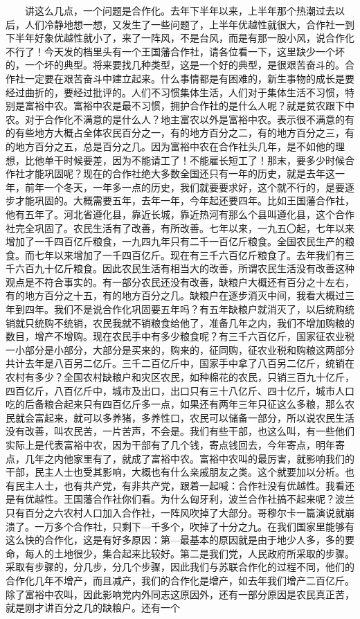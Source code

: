 \documentclass[cn,11pt,chinese]{elegantbook}
\begin{document}
　　讲这么几点，一个问题是合作化。去年下半年以来，上半年那个热潮过去以后，人们冷静地想一想，又发生了一些问题了，上半年优越性就很大，合作社一到下半年好象优越性就小了，来了一阵风，不是台风，而是有那一股小风，说合作化不行了！今天发的档里头有一个王国藩合作社，请各位看一下，这里缺少一个坏的，一个坏的典型。将来要找几种类型，这是一个好的典型，是很艰苦奋斗的。合作社一定要在艰苦奋斗中建立起来。什么事情都是有困难的，新生事物的成长是要经过曲折的，要经过批评的。人们不习惯集体生活，人们对于集体生活不习惯，特别是富裕中农。富裕中农是最不习惯，拥护合作社的是什么人呢？就是贫农跟下中农。对于合作化不满意的是什么人？地主富农以外是富裕中农。表示很不满意的有的有些地方大概占全体农民百分之一，有的地方百分之二，有的地方百分之三，有的地方百分之五，总是百分之几。因为富裕中农在合作社头几年，是不如他的理想，比他单干时候要差，因为不能请工了！不能雇长短工了！那末，要多少时候合作社才能巩固呢？现在的合作社绝大多数全国还只有一年的历史，就是去年这一年，前年一个冬天，一年多一点的历史，我们就要要求好，这个就不行的，是要逐步才能巩固的。大概需要五年，去年一年，今年起还要四年。比如王国藩合作社，他有五年了。河北省遵化县，靠近长城，靠近热河有那么个县叫遵化县，这个合作社完全巩固了。农民生活有了改善，有所改善。七年以来，一九五〇起，七年以来增加了一千四百亿斤粮食，一九四九年只有二千一百亿斤粮食。全国农民生产的粮食。而七年以来增加了一千四百亿斤。现在有三千六百亿斤粮食了。去年我们有三千六百九十亿斤粮食。因此农民生活有相当大的改善，所谓农民生活没有改善这种观点是不符合事实的。有一部分农民还没有改善，缺粮户大概还有百分之十左右，有的地方百分之十五，有的地方百分之几。缺粮户在逐步消灭中间，我看大概过三年到四年。我们不是说合作化巩固要五年吗？有五年缺粮户就消灭了，以后统购统销就只统购不统销，农民我就不销粮食给他了，准备几年之内，我们不增加购粮的数目，增产不增购。现在农民手中有多少粮食呢？有三千六百亿斤，国家征农业税一小部分是小部分，大部分是买来的，购来的，征同购，征农业税和购粮这两部分共计去年是八百另二亿斤。三千二百亿斤中，国家手中拿了八百另二亿斤，统销在农村有多少？全国农村缺粮户和灾区农民，如种棉花的农民，只销三百九十亿斤，四百亿斤，八百亿斤中，城市及出口，出口只有三十八亿斤、四十亿斤，城市人口吃的后备粮合起来只有四百亿斤多一点，如果还有两年三年只征这么多粮，那么农民就会富起来，就可以多养猪，多养性口，农民可以储备一部分，所以说农民生活没有改善，叫农民苦，一片苦声，不会是。我们有些干部，也这么叫，有一些他们实际上是代表富裕中农，因为干部有了几个钱，寄点钱回去，今年寄点，明年寄点，几年之内他家里有了，就成了富裕中农。富裕中农叫的最厉害，就影响我们的干部，民主人士也受其影响，大概也有什么亲戚朋友之类。这个就要加以分析。也有民主人士，也有共产党，有非共产党，跟着一起喊：合作社没有优越性。我看还是有优越性。王国藩合作社你们看。为什么匈牙利，波兰合作社搞不起来呢？波兰只有百分之六农村人口加入合作社，一阵风吹掉了大部分。哥穆尔卡一篇演说就崩溃了。一万多个合作社，只剩下—千多个，吹掉了十分之九。在我们国家里能够有这么快的合作化，这是有好多原因：第—最基本的原因就是由于地少人多，多的要命，每人的土地很少，集合起来比较好。第二是我们党，人民政府所采取的步骤。采取有步骤的，分几步，分几个步骤，因此我们与苏联合作化的过程不同，他们的合作化几年不增产，而且减产，我们的合作化是增产，如去年我们增产二百亿斤。除了富裕中农叫，因此影响党内外同志这原因外，还有一部分原因是农民真正苦，就是刚才讲百分之几的缺粮户。还有一个
\end{document}
